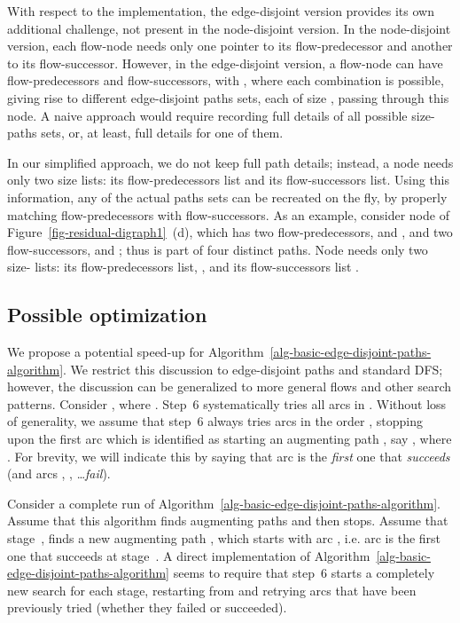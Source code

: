 \documentclass[preliminary,copyright,creativecommons]{eptcs}
\theoremstyle{remark}
\begin{document}
With respect to the implementation, the edge-disjoint version provides 
its own additional challenge, not present in the node-disjoint version. 
In the node-disjoint version,
each flow-node needs only one pointer to its flow-predecessor and another 
to its flow-successor. However, in the edge-disjoint version,
a flow-node can have  flow-predecessors and  flow-successors, with ,
where each combination is possible, giving rise to  
different edge-disjoint paths sets, each of size , passing through this node.
A naive approach would require recording full details of all  possible 
size- paths sets,
or, at least, full details for one of them.

In our simplified approach, we do not keep full path details;
instead, a node needs only two size  lists:
its flow-predecessors list and its flow-successors list.
Using this information, any of the actual  paths sets can be recreated on the fly,
by properly matching flow-predecessors with flow-successors.
As an example, consider node  of Figure~\ref{fig-residual-digraph1}~(d),
which has two flow-predecessors,  and , and two flow-successors,  and ;
thus  is part of four distinct paths.
Node  needs only two size- lists:
its flow-predecessors list, , and its flow-successors list .


\subsection{Possible optimization}
\label{sec-possible-optimization}

We propose a potential speed-up for Algorithm~\ref{alg-basic-edge-disjoint-paths-algorithm}.
We restrict this discussion to edge-disjoint paths and standard DFS;
however, the discussion can be generalized to more general flows and other search patterns.
Consider , where . 
Step~6 systematically tries all arcs in .
Without loss of generality, we assume that step~6 
always tries arcs in the order ,
stopping upon the first arc which is identified as starting an augmenting path ,
say , where .
For brevity, we will indicate this by saying that 
arc  is the \emph{first} one that \emph{succeeds}
(and arcs , , \dots  \emph{fail}).

Consider a complete run of Algorithm~\ref{alg-basic-edge-disjoint-paths-algorithm}.
Assume that this algorithm finds  augmenting paths and then stops. 
Assume that stage~, finds a new augmenting path ,
which starts with arc , 
i.e. arc  is the first one that succeeds at stage~.
A direct implementation of Algorithm~\ref{alg-basic-edge-disjoint-paths-algorithm} 
seems to require that step~6 starts a completely new search for each stage, 
restarting from  and retrying arcs that have been previously tried 
(whether they failed or succeeded).
\end{document}
